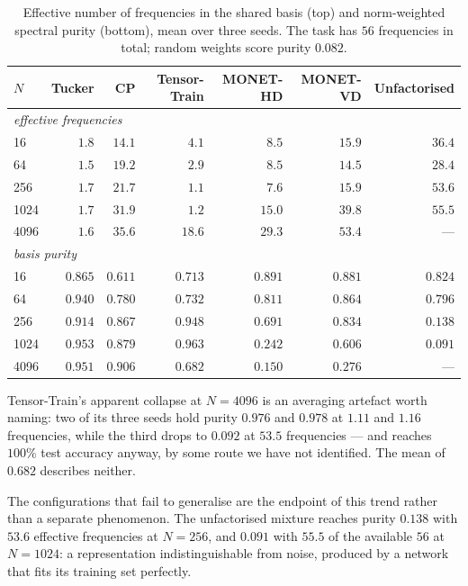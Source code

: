 \begin{table}[ht]
\centering
\caption{Effective number of frequencies in the shared basis (top) and
norm-weighted spectral purity (bottom), mean over three seeds. The task has
$56$ frequencies in total; random weights score purity $0.082$.}
\label{tab:basis-scaling}
\footnotesize
\begin{tabular}{lrrrrrr}
\toprule
$N$ & Tucker & CP & Tensor-Train & MONET-HD & MONET-VD & Unfactorised \\
\midrule
\multicolumn{7}{l}{\emph{effective frequencies}} \\
   16 & $1.8$ & $14.1$ & $4.1$  & $8.5$  & $15.9$ & $36.4$ \\
   64 & $1.5$ & $19.2$ & $2.9$  & $8.5$  & $14.5$ & $28.4$ \\
  256 & $1.7$ & $21.7$ & $1.1$  & $7.6$  & $15.9$ & $53.6$ \\
 1024 & $1.7$ & $31.9$ & $1.2$  & $15.0$ & $39.8$ & $55.5$ \\
 4096 & $1.6$ & $35.6$ & $18.6$ & $29.3$ & $53.4$ & --- \\
\midrule
\multicolumn{7}{l}{\emph{basis purity}} \\
   16 & $0.865$ & $0.611$ & $0.713$ & $0.891$ & $0.881$ & $0.824$ \\
   64 & $0.940$ & $0.780$ & $0.732$ & $0.811$ & $0.864$ & $0.796$ \\
  256 & $0.914$ & $0.867$ & $0.948$ & $0.691$ & $0.834$ & $0.138$ \\
 1024 & $0.953$ & $0.879$ & $0.963$ & $0.242$ & $0.606$ & $0.091$ \\
 4096 & $0.951$ & $0.906$ & $0.682$ & $0.150$ & $0.276$ & --- \\
\bottomrule
\end{tabular}
\end{table}

Tensor-Train's apparent collapse at $N = 4096$ is an averaging artefact worth
naming: two of its three seeds hold purity $0.976$ and $0.978$ at $1.11$ and
$1.16$ frequencies, while the third drops to $0.092$ at $53.5$ frequencies ---
and reaches $100\%$ test accuracy anyway, by some route we have not identified.
The mean of $0.682$ describes neither.

The configurations that fail to generalise are the endpoint of this trend
rather than a separate phenomenon. The unfactorised mixture reaches purity
$0.138$ with $53.6$ effective frequencies at $N = 256$, and $0.091$ with $55.5$
of the available $56$ at $N = 1024$: a representation indistinguishable from
noise, produced by a network that fits its training set perfectly.

